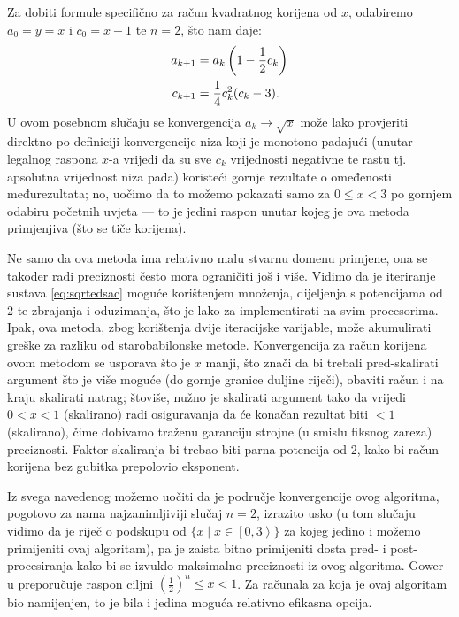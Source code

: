 \documentclass[12pt]{scrartcl}
\begin{document}
Za dobiti formule specifično za račun kvadratnog korijena od $x$, odabiremo $a_0=y=x$ i $c_0=x-1$ te $n=2$, što nam daje:
\begin{equation}
    \begin{aligned}\label{eq:sqrtedsac}
        a_{k+1} &= a_k\left(1-\frac12 c_k\right)\\
        c_{k+1} &= \frac14 c^2_k(c_k-3)\text.
    \end{aligned}
\end{equation}
U ovom posebnom slučaju se konvergencija $a_k\to\sqrt x$ može lako provjeriti direktno po definiciji konvergencije
niza koji je monotono padajući (unutar legalnog raspona $x$-a vrijedi da su sve $c_k$ vrijednosti negativne te rastu tj.
apsolutna vrijednost niza pada) koristeći gornje rezultate o omeđenosti međurezultata; no, uočimo da to možemo pokazati
samo za $0\leq x<3$ po gornjem odabiru početnih uvjeta --- to je jedini raspon unutar kojeg je ova metoda primjenjiva (što se tiče korijena).

Ne samo da ova metoda ima relativno malu stvarnu domenu primjene, ona se također radi preciznosti često mora ograničiti još i više.
Vidimo da je iteriranje sustava \eqref{eq:sqrtedsac} moguće korištenjem množenja, dijeljenja s potencijama od $2$ te zbrajanja i oduzimanja, što
je lako za implementirati na svim procesorima. Ipak, ova metoda, zbog korištenja dvije iteracijske varijable, može akumulirati greške za razliku
od starobabilonske metode. Konvergencija za račun korijena ovom metodom se usporava što je $x$ manji, što znači da bi trebali pred-skalirati argument
što je više moguće (do gornje granice duljine riječi), obaviti račun i na kraju skalirati natrag; štoviše, nužno je
skalirati argument tako da vrijedi $0<x<1$ (skalirano) radi osiguravanja da će konačan rezultat biti $<1$ (skalirano), čime dobivamo
traženu garanciju strojne (u smislu fiksnog zareza) preciznosti. 
Faktor skaliranja bi trebao biti parna potencija od $2$,
kako bi račun korijena bez gubitka prepolovio eksponent.

Iz svega navedenog možemo uočiti da je područje konvergencije ovog algoritma, pogotovo za nama najzanimljiviji slučaj $n=2$, izrazito usko
(u tom slučaju vidimo da je riječ o podskupu od $\{x\mid x\in\left[0,3\right\rangle\}$ za kojeg jedino i možemo primijeniti ovaj algoritam), pa je
zaista bitno primijeniti dosta pred- i post-procesiranja kako bi se izvuklo maksimalno preciznosti iz ovog algoritma.
Gower u \cite{gower} preporučuje raspon ciljni $(\frac12)^n\leq x<1$.
Za računala za koja je
ovaj algoritam bio
namijenjen, to je bila i jedina moguća relativno efikasna opcija.
\end{document}
